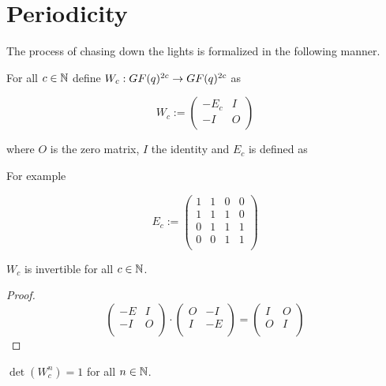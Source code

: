 \section{Periodicity}

The process of chasing down the lights is formalized in the following
manner.

For all $c\in\mathbb{N}$ define $W_{c} : GF(q)^{2c} \rightarrow GF(q)^{2c}$
as

\[
W_{c} := \left(
\begin{array}{cc}
  -E_{c} & I \\
  -I    & O \\
\end{array}
\right)
\]

where $O$ is the zero matrix, $I$ the identity and $E_{c}$ is defined
as

For example

\[
E_{c} := \left(
\begin{array}{cccc}
  1 & 1 & 0 & 0 \\
  1 & 1 & 1 & 0 \\
  0 & 1 & 1 & 1 \\
  0 & 0 & 1 & 1 \\
\end{array}
\right)
\]

\begin{lemma}
  $W_{c}$ is invertible for all $c\in\mathbb{N}$.
\end{lemma}

\begin{proof}
  \[
  \left(
  \begin{array}{cc}
    -E & I \\
    -I & O \\
  \end{array}
  \right)
  \cdot
  \left(
  \begin{array}{cc}
    O & -I  \\
    I & -E \\
  \end{array}
  \right)
  =
  \left(
  \begin{array}{cc}
    I & O \\
    O & I \\
  \end{array}			
  \right)
  \]
\end{proof}


\begin{lemma}
  $\det(W_{c}^{n}) = 1$ for all $n\in\mathbb{N}$.
\end{lemma}


